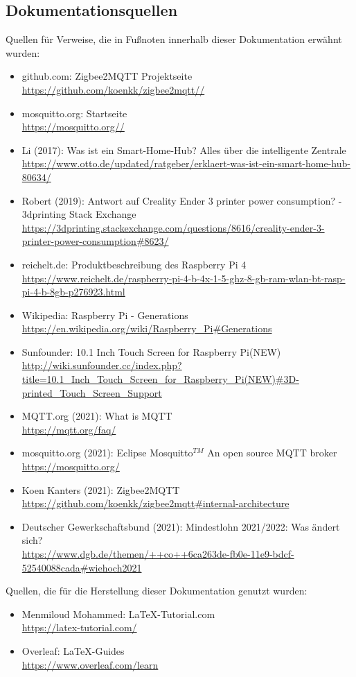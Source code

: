 \subsection{Dokumentationsquellen}\label{qu_doku}
Quellen für Verweise, die in Fußnoten innerhalb dieser Dokumentation erwähnt wurden:
\begin{itemize}
        \item github.com: Zigbee2MQTT Projektseite\\ 
        {\url{https://github.com/koenkk/zigbee2mqtt//}}
        \item mosquitto.org: Startseite\\ 
        {\url{https://mosquitto.org//}}
 		\item Li (2017): Was ist ein Smart-Home-Hub? Alles über die intelligente Zentrale\\ {\url{https://www.otto.de/updated/ratgeber/erklaert-was-ist-ein-smart-home-hub-80634/}}
 		\item Robert (2019): Antwort auf Creality Ender 3 printer power consumption? - 3dprinting Stack Exchange\\ {\url{https://3dprinting.stackexchange.com/questions/8616/creality-ender-3-printer-power-consumption#8623/}}
 		\item reichelt.de: Produktbeschreibung des Raspberry Pi 4\\{\url{https://www.reichelt.de/raspberry-pi-4-b-4x-1-5-ghz-8-gb-ram-wlan-bt-rasp-pi-4-b-8gb-p276923.html}}
 		\item Wikipedia: Raspberry Pi - Generations\\{\url{https://en.wikipedia.org/wiki/Raspberry_Pi#Generations}}
 		\item Sunfounder: 10.1 Inch Touch Screen for Raspberry Pi(NEW)\\{\url{http://wiki.sunfounder.cc/index.php?title=10.1_Inch_Touch_Screen_for_Raspberry_Pi(NEW)#3D-printed_Touch_Screen_Support}}
 		\item MQTT.org (2021): What is MQTT\\ {\url{https://mqtt.org/faq/}}
 		\item mosquitto.org (2021): Eclipse Mosquitto$^{TM}$ An open source MQTT broker\\ {\url{https://mosquitto.org/}}
 		\item Koen Kanters (2021): Zigbee2MQTT\\ {\url{https://github.com/koenkk/zigbee2mqtt#internal-architecture}}
 		\item Deutscher Gewerkschaftsbund (2021): Mindestlohn 2021/2022: Was ändert sich?\\{\url{https://www.dgb.de/themen/++co++6ca263de-fb0e-11e9-bdcf-52540088cada#wiehoch2021}}
\end{itemize}
Quellen, die für die Herstellung dieser Dokumentation genutzt wurden:
\begin{itemize}
	\item Menmiloud Mohammed: \LaTeX -Tutorial.com\\{\url{https://latex-tutorial.com/}}
	\item Overleaf: \LaTeX -Guides\\{\url{https://www.overleaf.com/learn}}
\end{itemize}